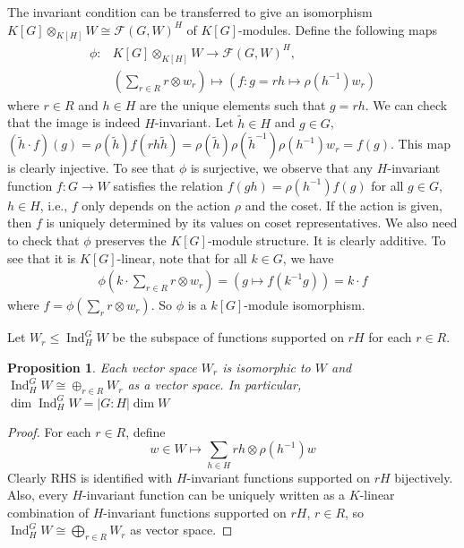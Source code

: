 \documentclass{article}
\theoremstyle{definition}
\theoremstyle{remark}
\theoremstyle{plain}
\newtheorem{prop}[defn]{Proposition}
\begin{document}
The invariant condition can be transferred to give an isomorphism $K[G]\otimes_{K[H]}W\cong\mathcal{F}(G,W)^H$ of $K[G]$-modules. Define the following maps
\begin{align*}
    \phi:&K[G]\otimes_{K[H]}W\to \mathcal{F}(G,W)^H,\\ &\left(\sum_{r\in R}r\otimes w_r\right)\mapsto (f:g=rh\mapsto \rho(h^{-1})w_r)
\end{align*}
where $r\in R$ and $h\in H$ are the unique elements such that $g=rh$.
We can check that the image is indeed $H$-invariant. Let $\tilde h\in H$ and $g\in G$, $(\tilde h\cdot f)(g)=\rho(\tilde h)f(rh\tilde h)=\rho(\tilde h)\rho(\tilde h^{-1})\rho(h^{-1})w_r=f(g)$. 
This map is clearly injective. To see that $\phi$ is surjective, we observe that any $H$-invariant function $f:G\to W$ satisfies the relation $f(gh)=\rho(h^{-1})f(g)$ for all $g\in G$, $h\in H$, i.e., $f$ only depends on the action $\rho$ and the coset. If the action is given, then $f$ is uniquely determined by its values on coset representatives. We also need to check that $\phi$ preserves the $K[G]$-module structure. It is clearly additive. To see that it is $K[G]$-linear, note that for all $k\in G$, we have
\begin{align*}
    \phi\left(k\cdot \sum_{r\in R}r\otimes w_r\right)=(g\mapsto f(k^{-1}g))=k\cdot f
\end{align*}
where $f=\phi\left(\sum_rr\otimes w_r\right)$. So $\phi$ is a $k[G]$-module isomorphism.

Let $W_r\le \operatorname{Ind}_H^GW$ be the subspace of functions supported on $rH$ for each $r\in R$.
\begin{prop}
    Each vector space $W_r$ is isomorphic to $W$ and $\operatorname{Ind}_H^GW\cong\oplus_{r\in R}W_r$ as a vector space. In particular, $\dim \operatorname{Ind}_H^GW=|G:H|\dim W$
\end{prop}
\begin{proof}
    For each $r\in R$, define 
    \[w\in W\mapsto \sum_{h\in H}rh\otimes\rho(h^{-1})w\]
    Clearly RHS is identified with $H$-invariant functions supported on $rH$ bijectively. Also, every $H$-invariant function can be uniquely written as a $K$-linear combination of $H$-invariant functions supported on $rH$, $r\in R$, so $\operatorname{Ind}_H^GW\cong \bigoplus_{r\in R}W_r$ as vector space.
\end{proof}
\end{document}
